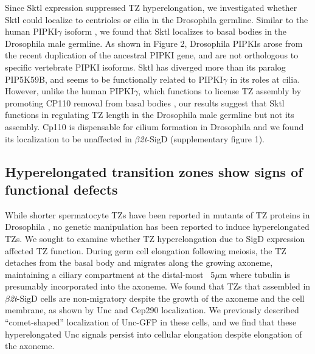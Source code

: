 \documentclass[12pt, twoside, letterpaper]{article}
\newcommand{\sigd}{$\beta$\textit{2t}-SigD}
\begin{document}
Since Sktl expression suppressed TZ hyperelongation,
we investigated whether Sktl could localize to centrioles or cilia in the Drosophila germline.
Similar to the human PIPKI$\gamma$ isoform \citep{xu2014pipkigamma},
we found that Sktl localizes to basal bodies in the Drosophila male germline.
As shown in Figure 2, Drosophila PIPKIs arose from the recent duplication of
the ancestral PIPKI gene, and are not orthologous to specific vertebrate PIPKI isoforms.
Sktl has diverged more than its paralog PIP5K59B, and seems
to be functionally related to PIPKI$\gamma$ in its roles at cilia.
However, unlike the human PIPKI$\gamma$, which functions to license TZ assembly
by promoting CP110 removal from basal bodies \citep{xu2016phosphatidylinositol},
our results suggest that Sktl functions in
regulating TZ length in the Drosophila male germline
but not its assembly.
Cp110 is dispensable for cilium formation in Drosophila \citep{franz2013cp110}
and we found its localization to be unaffected in \sigd{} (supplementary figure 1).

\subsection{Hyperelongated transition zones show signs of functional defects}
While shorter spermatocyte TZs have been reported in mutants of TZ proteins in Drosophila
\citep{vieillard2016transition, pratt2016drosophila},
no genetic manipulation has been reported to induce hyperelongated TZs.
We sought to examine whether TZ hyperelongation due to SigD expression
affected TZ function.
During germ cell elongation following meiosis, the TZ detaches from
the basal body and migrates along the growing axoneme, maintaining a ciliary compartment
at the distal-most ~5$\mu$m where tubulin is presumably incorporated into the axoneme.
We found that
TZs that assembled in \sigd{} cells are non-migratory despite the growth of the
axoneme and the cell membrane, as shown by Unc and Cep290 localization.
We previously described ``comet-shaped'' localization of Unc-GFP in these cells,
and we find that these hyperelongated Unc signals persist into cellular elongation
despite elongation of the axoneme.
\end{document}
